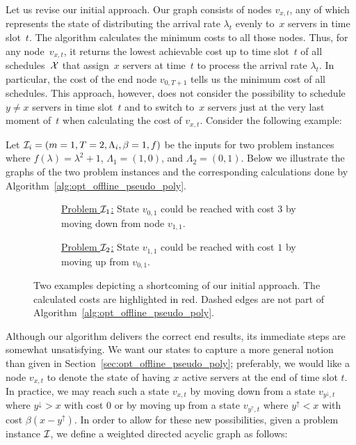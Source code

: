 Let us revise our initial approach. Our graph consists of nodes $v_{x,t}$, any of which represents the state of distributing the arrival rate $\lambda_{t}$ evenly to~$x$ servers in time slot~$t$. The algorithm calculates the minimum costs to all those nodes. Thus, for any node~$v_{x,t}$, it returns the lowest achievable cost up to time slot~$t$ of all schedules~$\mathcal{X}$ that assign~$x$ servers at time~$t$ to process the arrival rate $\lambda_t$. In particular, the cost of the end node $v_{0,T+1}$ tells us the minimum cost of all schedules. This approach, however, does not consider the possibility to schedule $y\neq x$ servers in time slot~$t$ and to switch to~$x$ servers just at the very last moment of~$t$ when calculating the cost of $v_{x,t}$. Consider the following example:
\begin{exmpl}
Let $\mathcal{I}_i=(m=1,T=2,\Lambda_i,\beta=1,f)$ be the inputs for two problem instances where $f(\lambda)=\lambda^2+1$, $\Lambda_1=(1,0)$, and $\Lambda_2=(0,1)$. Below we illustrate the graphs of the two problem instances and the corresponding calculations done by Algorithm~\ref{alg:opt_offline_pseudo_poly}.
\begin{figure}[H]
\captionsetup[subfigure]{labelformat=empty}
\begin{subfigure}[b]{0.48\textwidth}

\caption{\underline{Problem $\mathcal{I}_1$:} State $v_{0,1}$ could be reached with cost $3$ by moving down from node $v_{1,1}$.}
\end{subfigure}
\hfill
\begin{subfigure}[b]{0.48\textwidth}

\caption{\underline{Problem $\mathcal{I}_2$:} State $v_{1,1}$ could be reached with cost $1$ by moving up from $v_{0,1}$.}
\end{subfigure}
\caption{Two examples depicting a shortcoming of our initial approach. The calculated costs are highlighted in red. Dashed edges are not part of Algorithm~\ref{alg:opt_offline_pseudo_poly}.}
\end{figure}
\end{exmpl}
Although our algorithm delivers the correct end results, its immediate steps are somewhat unsatisfying. We want our states to capture a more general notion than given in Section~\ref{sec:opt_offline_pseudo_poly}; preferably, we would like a node $v_{x,t}$ to denote the state of having $x$ active servers at the end of time slot $t$. In practice, we may reach such a state $v_{x,t}$ by moving down from a state $v_{y^\downarrow,t}$ where $y^\downarrow>x$ with cost $0$ or by moving up from a state $v_{y^\uparrow,t}$ where $y^\uparrow<x$ with cost $\beta(x-y^\uparrow)$. In order to allow for these new possibilities, given a problem instance $\mathcal{I}$, we define a weighted directed acyclic graph as follows:
